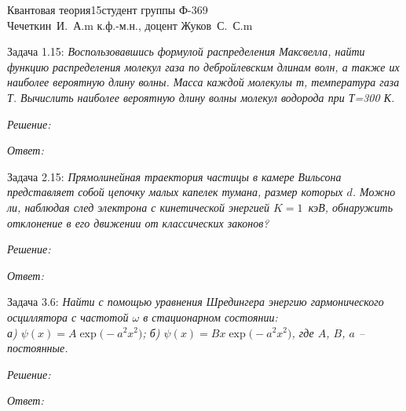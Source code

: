 



\newcommand{\ds}{\displaystyle}
\newcommand{\h}{\hbar}
\newcommand{\comm}[2]{\left[#1,\ #2\right]}


{Квантовая теория}{}{15}{студент группы Ф-369\\Чечеткин~И.~А.}{m}
{к.ф.-м.н., доцент Жуков~С.~С.}{m}

\newpage

Задача 1.15: \emph{Воспользовавшись формулой распределения Максвелла, найти 
функцию распределения молекул газа по дебройлевским длинам волн, 
а также их наиболее вероятную длину волны. Масса каждой молекулы 
т, температура газа Т. Вычислить наиболее вероятную длину волны 
молекул водорода при Т=300 К.}

\vspace*{2em}
\emph{Решение:}

\vspace*{2em}        
\emph{Ответ:}

\newpage

Задача 2.15: \emph{Прямолинейная траектория частицы в камере Вильсона
представляет собой цепочку малых капелек тумана, размер которых \( d \). Можно
ли, наблюдая след электрона с кинетической энергией \( K = 1 \)~кэВ, обнаружить
отклонение в его движении от классических законов?}

\vspace*{2em}
\emph{Решение:}

\vspace*{2em}
\emph{Ответ:}

\newpage

Задача 3.6: \emph{Найти с помощью уравнения Шредингера энергию гармонического
осциллятора с частотой \( \omega \) в стационарном состоянии:\\
а) \( \ds \psi(x) = A\exp\big(-a^2x^2\big) \); б) \( \ds \psi(x) = Bx\exp\big(
-a^2x^2\big) \), где \( A \), \( B \), \( a \) -- постоянные.}

\vspace*{2em}
\emph{Решение:}

\vspace*{2em}
\emph{Ответ:}

